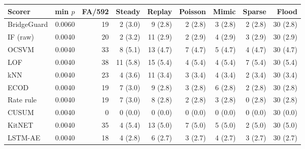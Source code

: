 \begin{tabular}{l r r rrrrrr}
\toprule
Scorer & min $p$ & FA/592 & Steady & Replay & Poisson & Mimic & Sparse & Flood \\
\midrule
BridgeGuard & 0.0060 & 19 & 2 (3.0) & 9 (2.8) & 2 (2.8) & 3 (2.8) & 2 (2.8) & 30 (2.8) \\
IF (raw) & 0.0040 & 20 & 2 (3.2) & 11 (2.9) & 2 (2.9) & 4 (2.9) & 3 (2.9) & 30 (2.9) \\
OCSVM & 0.0040 & 33 & 8 (5.1) & 13 (4.7) & 7 (4.7) & 5 (4.7) & 4 (4.7) & 30 (4.7) \\
LOF & 0.0040 & 38 & 11 (5.8) & 15 (5.4) & 4 (5.4) & 4 (5.4) & 7 (5.4) & 30 (5.4) \\
kNN & 0.0040 & 23 & 4 (3.6) & 11 (3.4) & 3 (3.4) & 4 (3.4) & 2 (3.4) & 30 (3.4) \\
ECOD & 0.0040 & 19 & 7 (3.0) & 9 (2.8) & 3 (2.8) & 6 (2.8) & 2 (2.8) & 30 (2.8) \\
Rate rule & 0.0040 & 19 & 7 (3.0) & 8 (2.8) & 2 (2.8) & 3 (2.8) & 0 (2.8) & 30 (2.8) \\
CUSUM & 0.0040 & 0 & 0 (0.0) & 0 (0.0) & 0 (0.0) & 0 (0.0) & 0 (0.0) & 30 (0.0) \\
KitNET & 0.0040 & 35 & 4 (5.4) & 13 (5.0) & 7 (5.0) & 5 (5.0) & 2 (5.0) & 30 (5.0) \\
LSTM-AE & 0.0040 & 18 & 4 (2.8) & 6 (2.7) & 3 (2.7) & 4 (2.7) & 3 (2.7) & 30 (2.7) \\
\bottomrule
\end{tabular}
